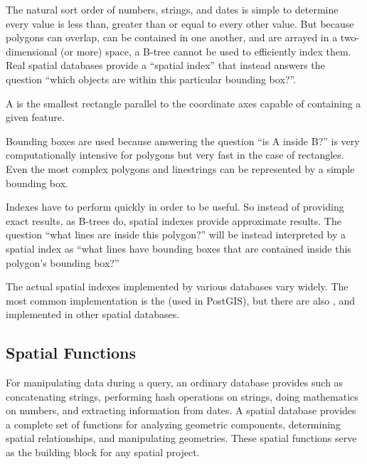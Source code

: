 \documentclass[a4paper,11pt,english]{sphinxmanual}
\begin{document}
The natural sort order of numbers, strings, and dates is simple to determine \textendash{} every value is less than, greater than or equal to every other value. But because polygons can overlap, can be contained in one another, and are arrayed in a two-dimensional (or more) space, a B-tree cannot be used to efficiently index them. Real spatial databases provide a “spatial index” that instead answers the question “which objects are within this particular bounding box?”.

A  is the smallest rectangle \textendash{} parallel to the coordinate axes \textendash{} capable of containing a given feature.


Bounding boxes are used because answering the question “is A inside B?” is very computationally intensive for polygons but very fast in the case of rectangles.  Even the most complex polygons and linestrings can be represented by a simple bounding box.

Indexes have to perform quickly in order to be useful. So instead of providing exact results, as B-trees do, spatial indexes provide approximate results. The question “what lines are inside this polygon?” will be instead interpreted by a spatial index as “what lines have bounding boxes that are contained inside this polygon’s bounding box?”

The actual spatial indexes implemented by various databases vary widely. The most common implementation is the  (used in PostGIS), but there are also , and  implemented in other spatial databases.


\subsection{Spatial Functions}
\label{\detokenize{introduction:spatial-functions}}
For manipulating data during a query, an ordinary database provides  such as concatenating strings, performing hash operations on strings, doing mathematics on numbers, and extracting information from dates.  A spatial database provides a complete set of functions for analyzing geometric components, determining spatial relationships, and manipulating geometries.  These spatial functions serve as the building block for any spatial project.
\end{document}

